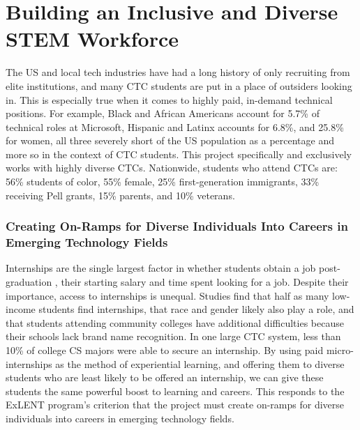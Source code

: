 \section{Building an Inclusive and Diverse STEM Workforce}

The US and local tech industries have had a long history of only recruiting from elite institutions, and many CTC students are put in a place of outsiders looking in. This is especially true when it comes to highly paid, in-demand technical positions. For example, Black and African Americans account for 5.7\% of technical roles at Microsoft, Hispanic and Latinx accounts for 6.8\%, and 25.8\% for women, \cite{microsoftDiversityInclusionReport} all three severely short of the US population as a percentage and more so in the context of CTC students. This project specifically and exclusively works with highly diverse CTCs. Nationwide, students who attend CTCs are: 56\% students of color, 55\% female, 25\% first-generation immigrants, 33\% receiving Pell grants, 15\% parents, and 10\% veterans.\cite{AlmanacAmericanEducation,phillippeNationalProfileCommunity2005} 

\subsubsection{Creating On-Ramps for Diverse Individuals Into Careers in Emerging Technology Fields}

Internships are the single largest factor in whether students obtain a job post-graduation \cite{callananAssessingRoleInternships2004,jonesTransformingCurriculumPreparing2002,knouseRelationCollegeInternships1999,saltikoffPositiveImplicationsInternships2017,stepanovaHiringCSGraduates2021}, their starting salary and time spent looking for a job.\cite{gaultUndergraduateBusinessInternships2000} Despite their importance, access to internships is unequal. Studies find that half as many low-income students find internships,\cite{kapoorExploringParticipationCS2020,singerLowerIncomeStudentsBig2023} that race and gender likely also play a role, and that students attending community colleges have additional difficulties because their schools lack brand name recognition.\cite{menezesOpenSourceInternshipsIndustry,lohrEngineUpwardMobility2022} In one large CTC system, less than 10\% of college CS majors were able to secure an internship.\cite{lohrEngineUpwardMobility2022} By using paid micro-internships as the method of experiential learning, and offering them to diverse students who are least likely to be offered an internship, we can give these students the same powerful boost to learning\cite{ellisPowerOpenSource2021,hislopStudentReflectionsLearning2020,hislopOpenSourceExtracurricular2019,postnerSurveyInstructorsExperiences2018} and careers\cite{saltikoffPositiveImplicationsInternships2017}. This responds to the ExLENT program’s criterion that the project must create on-ramps for diverse individuals into careers in emerging technology fields.


